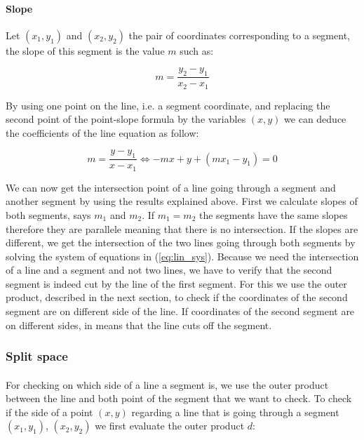 \documentclass[letterpaper]{article}
\begin{document}
\paragraph{Slope}
Let $(x_1, y_1)$ and $(x_2, y_2)$ the pair of coordinates corresponding to a segment,
the slope of this segment is the value $m$ such as:

\begin{equation}
m = \frac{y_2 - y_1}{x_2 - x_1}
\end{equation}

By using one point on the line, i.e. a segment coordinate,
 and replacing the second point of the point-slope formula by the variables
 $(x, y)$ we can deduce the coefficients of the line equation as follow:


\begin{equation}
 m = \frac{y - y_1}{x - x_1} \iff
-mx + y + (mx_1 - y_1) = 0
\end{equation}

We can now get the intersection point of a line going through a segment and another
segment by using the results explained above. First we calculate slopes
of both segments, says $m_1$ and $m_2$. If $m_1 =m_2$ the segments have the same
slopes therefore they are parallele meaning that there is no intersection.
If the slopes are different, we get the intersection of the two lines going through
both segments by solving the system of equations in (\ref{eq:lin_sys}).
Because we need the intersection of a line and a segment and not two lines, we
have to verify that the second segment is indeed cut by the line of the first segment.
For this we use the outer product, described in the next section,
to check if the coordinates of the second segment are on different side of the line.
If coordinates of the second segment are on different sides, in means that the line
cuts off the segment.

\subsubsection{Split space}

\paragraph{}

For checking on which side of a line a segment is, we use the outer product between
the line and both point of the segment that we want to check. To check if
the side of a point $(x, y)$ regarding a line that is going through a segment
$(x_1, y_1)$, $(x_2, y_2)$ we first evaluate the outer product $d$:
\end{document}
